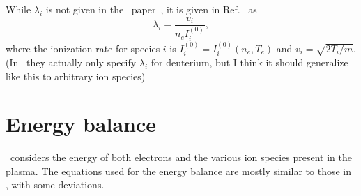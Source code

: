 \documentclass{notes}
\begin{document}
    While $\lambda_i$ is not given in the \DYON\ paper~\cite{Kim2012}, it is
    given in Ref.~\cite{Lloyd1996} as
    \begin{equation}
        \lambda_i = \frac{v_i}{n_e I_i^{(0)}},
    \end{equation}
    where the ionization rate for species $i$ is $I_i^{(0)}=I_i^{(0)}(n_e,T_e)$
    and $v_i = \sqrt{2T_i/m}$. (In~\cite{Lloyd1996} they actually only specify
    $\lambda_i$ for deuterium, but I think it should generalize like this to
    arbitrary ion species)

    \section{Energy balance}\label{sec:energy}
    \DYON\ considers the energy of both electrons and the various ion species
    present in the plasma. The equations used for the energy balance are mostly
    similar to those in \DREAM, with some deviations.
\end{document}
